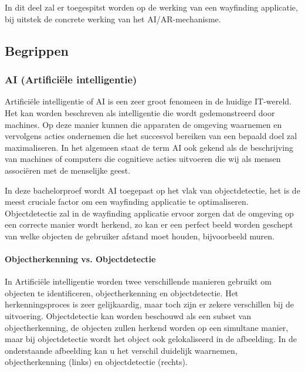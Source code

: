 \chapter{}
\label{ch:stand-van-zaken}




In dit deel zal er toegespitst worden op de werking van een wayfinding applicatie, bij uitstek de concrete werking van het AI/AR-mechanisme.

\section{Begrippen}
\subsection{AI (Artificiële intelligentie)}
Artificiële intelligentie of AI is een zeer groot fenomeen in de huidige IT-wereld. Het kan worden beschreven als intelligentie die wordt gedemonstreerd door machines. Op deze manier kunnen die apparaten de omgeving waarnemen en vervolgens acties ondernemen die het succesvol bereiken van een bepaald doel zal maximaliseren. In het algemeen staat de term AI ook gekend als de beschrijving van machines of computers die cognitieve acties uitvoeren die wij als mensen associëren met de menselijke geest.

In deze bachelorproef wordt AI toegepast op het vlak van objectdetectie, het is de meest cruciale factor om een wayfinding applicatie te optimaliseren.
Objectdetectie zal in de wayfinding applicatie ervoor zorgen dat de omgeving op een correcte manier wordt herkend, zo kan er een perfect beeld worden geschept van welke objecten de gebruiker afstand moet houden, bijvoorbeeld muren.

\subsubsection{Objectherkenning vs. Objectdetectie}
In Artificiële intelligentie worden twee verschillende manieren gebruikt om objecten te identificeren, objectherkenning en objectdetectie. Het herkenningsproces is zeer gelijkaardig, maar toch zijn er zekere verschillen bij de uitvoering. Objectdetectie kan worden beschouwd als een subset van objectherkenning, de objecten zullen herkend worden op een simultane manier, maar bij objectdetectie wordt het object ook gelokaliseerd in de afbeelding. In de onderstaande afbeelding kan u het verschil duidelijk waarnemen, objectherkenning (links) en objectdetectie (rechts). \autocite{ObjRec2020}

